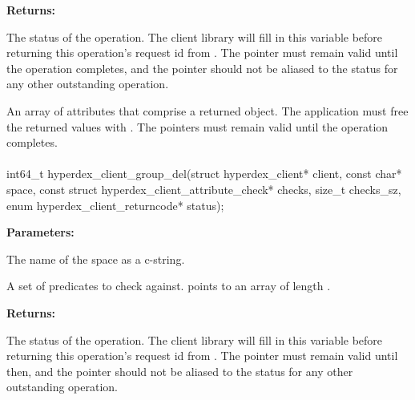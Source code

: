 \noindent\textbf{Returns:}
\begin{description}[labelindent=\widthof{{\code{attrs}, \code{attrs\_sz}}},leftmargin=*,noitemsep,nolistsep,align=right]
\item[\code{status}] The status of the operation.  The client library will fill in this variable before returning this operation's request id from .  The pointer must remain valid until the operation completes, and the pointer should not be aliased to the status for any other outstanding operation.
\item[\code{attrs}, \code{attrs\_sz}] An array of attributes that comprise a returned object.  The application must free the returned values with .  The pointers must remain valid until the operation completes.
\end{description}

\paragraph{}
\label{api:c:group_del}
\begin{ccode}
int64_t hyperdex_client_group_del(struct hyperdex_client* client,
        const char* space,
        const struct hyperdex_client_attribute_check* checks, size_t checks_sz,
        enum hyperdex_client_returncode* status);
\end{ccode}
\funcdesc 

\noindent\textbf{Parameters:}
\begin{description}[labelindent=\widthof{{\code{checks}, \code{checks\_sz}}},leftmargin=*,noitemsep,nolistsep,align=right]
\item[\code{space}] The name of the space as a c-string.
\item[\code{checks}, \code{checks\_sz}] A set of predicates to check against.   points to an array of length .
\end{description}

\noindent\textbf{Returns:}
\begin{description}[labelindent=\widthof{{\code{status}}},leftmargin=*,noitemsep,nolistsep,align=right]
\item[\code{status}] The status of the operation.  The client library will fill in this variable before returning this operation's request id from .  The pointer must remain valid until then, and the pointer should not be aliased to the status for any other outstanding operation.
\end{description}

